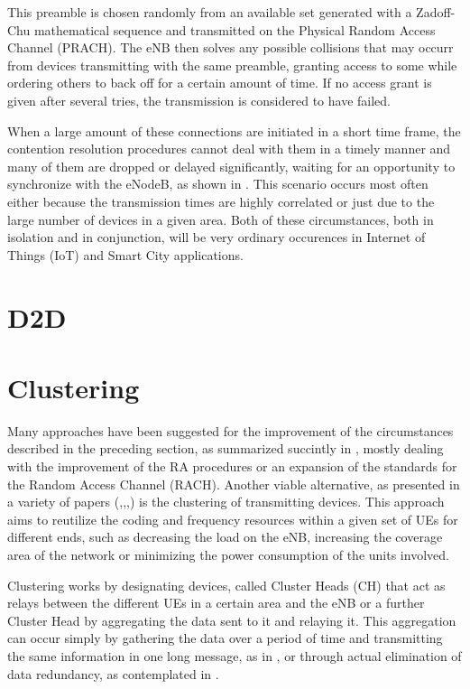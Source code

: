 This preamble is chosen randomly from an available set generated with a Zadoff-Chu mathematical sequence and transmitted on the Physical Random Access Channel (PRACH). The eNB then solves any possible collisions that may occurr from devices transmitting with the same preamble, granting access to some while ordering others to back off for a certain amount of time. If no access grant is given after several tries, the transmission is considered to have failed.

When a large amount of these connections are initiated in a short time frame, the contention resolution procedures cannot deal with them in a timely manner and many of them are dropped or delayed significantly, waiting for an opportunity to synchronize with the eNodeB, as shown in \cite{Polese2016}. This scenario occurs most often either because the transmission times are highly correlated or just due to the large number of devices in a given area. Both of these circumstances, both in isolation and in conjunction, will be very ordinary occurences in Internet of Things (IoT) and Smart City applications. 

\section{D2D}\label{B:D2D}

\section{Clustering}\label{B:Cl}

Many approaches have been suggested for the improvement of the circumstances described in the preceding section, as summarized succintly in \cite{Laya2014}, mostly dealing with the improvement of the RA procedures or an expansion of the standards for the Random Access Channel (RACH). Another viable alternative, as presented in a variety of papers (\cite{Wei2012a},\cite{Laya2014a},\cite{Wang2013},\cite{Liao2013}) is the clustering of transmitting devices. This approach aims to reutilize the coding and frequency resources within a given set of UEs for different ends, such as decreasing the load on the eNB, increasing the coverage area of the network or minimizing the power consumption of the units involved.

Clustering works by designating devices, called Cluster Heads (CH) that act as relays between the different UEs in a certain area and the eNB or a further Cluster Head by aggregating the data sent to it and relaying it. This aggregation can occur simply by gathering the data over a period of time and transmitting the same information in one long message, as in \cite{Shariatmadari2015}, or through actual elimination of data redundancy, as contemplated in \cite{Riker2015}.

